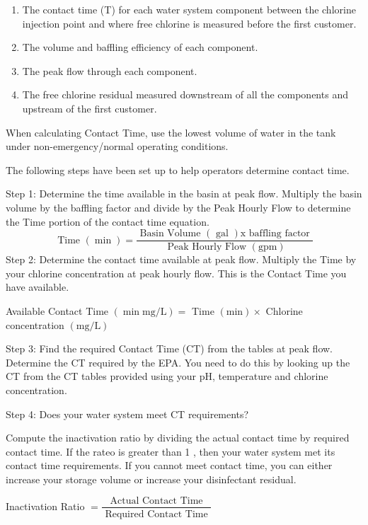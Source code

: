 \begin{enumerate}
  \item The contact time (T) for each water system component between the chlorine injection point and where free chlorine is measured before the first customer.

  \item The volume and baffling efficiency of each component.

  \item The peak flow through each component.

  \item The free chlorine residual measured downstream of all the components and upstream of the first customer.

\end{enumerate}
When calculating Contact Time, use the lowest volume of water in the tank under non-emergency/normal operating conditions.

The following steps have been set up to help operators determine contact time.

Step 1: Determine the time available in the basin at peak flow. Multiply the basin volume by the baffling factor and divide by the Peak Hourly Flow to determine the Time portion of the contact time equation.
$$
\text { Time }(\min )=\frac{\text { Basin Volume }(\text { gal }) \mathrm{x} \text { baffling factor }}{\text { Peak Hourly Flow }(\mathrm{gpm})}
$$
Step 2: Determine the contact time available at peak flow. Multiply the Time by your chlorine concentration at peak hourly flow. This is the Contact Time you have available.

Available Contact Time $(\min \mathrm{mg} / \mathrm{L})=$ Time $(\mathrm{min}) \times$ Chlorine concentration $(\mathrm{mg} / \mathrm{L})$

Step 3: Find the required Contact Time (CT) from the tables at peak flow. Determine the CT required by the EPA. You need to do this by looking up the CT from the CT tables provided using your $\mathrm{pH}$, temperature and chlorine concentration.

Step 4: Does your water system meet CT requirements?

Compute the inactivation ratio by dividing the actual contact time by required contact time. If the rateo is greater than 1 , then your water system met its contact time requirements. If you cannot meet contact time, you can either increase your storage volume or increase your disinfectant residual.

Inactivation Ratio $=\dfrac{\text { Actual Contact Time }}{\text { Required Contact Time }}$

